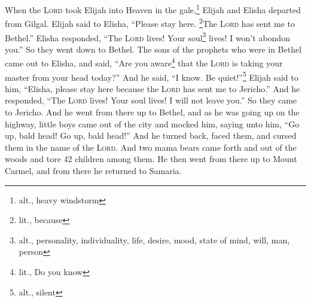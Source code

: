 
\begin{inparaenum}
     When the \textsc{Lord} took Elijah into Heaven in the gale,\footnote{alt., heavy windstorm} Elijah and Elisha departed from Gilgal.%
     Elijah said to Elisha, ``Please stay here. \footnote{lit., because}The \textsc{Lord} has sent me to Bethel.'' Elisha responded, ``The \textsc{Lord} lives! Your soul\footnote{alt., personality, individuality, life, desire, mood, state of mind, will, man, person} lives! I won't abondon you.'' So they went down to Bethel.%
     The sons of the prophets who were in Bethel came out to Elisha, and said, ``Are you aware\footnote{lit., Do you know} that the \textsc{Lord} is taking your master from your head today?'' And he said, ``I know. Be quiet!''\footnote{alt., silent}%
     Elijah said to him, ``Elisha, please stay here because the \textsc{Lord}  has sent me to Jericho.'' And he responded, ``The \textsc{Lord} lives! Your soul lives! I will not leave you.'' So they came to Jericho.%
     And he went from there up to Bethel, and as he was going up on the highway, little boys came out of the city and mocked him, saying unto him, ``Go up, bald head! Go up, bald head!''%
     And he turned back, faced them, and cursed them in the name of the \textsc{Lord}. And two mama bears came forth and out of the woods and tore 42 children among them.%
     He then went from there up to Mount Carmel, and from there he returned to Samaria.%
\end{inparaenum}
